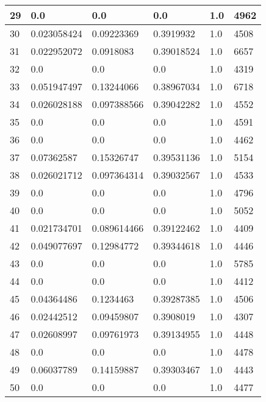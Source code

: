 \begin{longtable}{|l|l|l|l|l|l|}
29 & 0.0 & 0.0 & 0.0 & 1.0 & 4962 \\ \hline 
30 & 0.023058424 & 0.09223369 & 0.3919932 & 1.0 & 4508 \\ \hline 
31 & 0.022952072 & 0.0918083 & 0.39018524 & 1.0 & 6657 \\ \hline 
32 & 0.0 & 0.0 & 0.0 & 1.0 & 4319 \\ \hline 
33 & 0.051947497 & 0.13244066 & 0.38967034 & 1.0 & 6718 \\ \hline 
34 & 0.026028188 & 0.097388566 & 0.39042282 & 1.0 & 4552 \\ \hline 
35 & 0.0 & 0.0 & 0.0 & 1.0 & 4591 \\ \hline 
36 & 0.0 & 0.0 & 0.0 & 1.0 & 4462 \\ \hline 
37 & 0.07362587 & 0.15326747 & 0.39531136 & 1.0 & 5154 \\ \hline 
38 & 0.026021712 & 0.097364314 & 0.39032567 & 1.0 & 4533 \\ \hline 
39 & 0.0 & 0.0 & 0.0 & 1.0 & 4796 \\ \hline 
40 & 0.0 & 0.0 & 0.0 & 1.0 & 5052 \\ \hline 
41 & 0.021734701 & 0.089614466 & 0.39122462 & 1.0 & 4409 \\ \hline 
42 & 0.049077697 & 0.12984772 & 0.39344618 & 1.0 & 4446 \\ \hline 
43 & 0.0 & 0.0 & 0.0 & 1.0 & 5785 \\ \hline 
44 & 0.0 & 0.0 & 0.0 & 1.0 & 4412 \\ \hline 
45 & 0.04364486 & 0.1234463 & 0.39287385 & 1.0 & 4506 \\ \hline 
46 & 0.02442512 & 0.09459807 & 0.3908019 & 1.0 & 4307 \\ \hline 
47 & 0.02608997 & 0.09761973 & 0.39134955 & 1.0 & 4448 \\ \hline 
48 & 0.0 & 0.0 & 0.0 & 1.0 & 4478 \\ \hline 
49 & 0.06037789 & 0.14159887 & 0.39303467 & 1.0 & 4443 \\ \hline 
50 & 0.0 & 0.0 & 0.0 & 1.0 & 4477 \\ \hline 
\end{longtable}